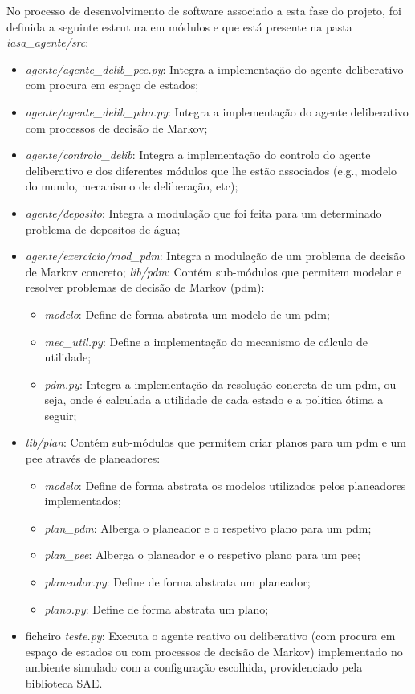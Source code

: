 No processo de desenvolvimento de software associado a esta fase do projeto, foi definida a seguinte estrutura em módulos e que está presente na pasta \textit{iasa\_agente/src}:

\begin{itemize}
    \item \textit{agente/agente\_delib\_pee.py}: Integra a implementação do agente deliberativo com procura em espaço de estados;
    \item \textit{agente/agente\_delib\_pdm.py}: Integra a implementação do agente deliberativo com processos de decisão de Markov;
    \item \textit{agente/controlo\_delib}: Integra a implementação do controlo do agente deliberativo e dos diferentes módulos que lhe estão associados (e.g., modelo do mundo, mecanismo de deliberação, etc);
    \item \textit{agente/deposito}: Integra a modulação que foi feita para um determinado problema de depositos de água;
    \item \textit{agente/exercicio/mod\_pdm}: Integra a modulação de um problema de decisão de Markov concreto;
    \textit{lib/pdm}: Contém sub-módulos que permitem modelar e resolver problemas de decisão de Markov (pdm):
    \begin{itemize}
        \item \textit{modelo}: Define de forma abstrata um modelo de um pdm;
        \item \textit{mec\_util.py}: Define a implementação do mecanismo de cálculo de utilidade;
        \item \textit{pdm.py}: Integra a implementação da resolução concreta de um pdm, ou seja, onde é calculada a utilidade de cada estado e a política ótima a seguir;
    \end{itemize}
    \item \textit{lib/plan}: Contém sub-módulos que permitem criar planos para um pdm e um pee através de planeadores:
    \begin{itemize}
        \item \textit{modelo}: Define de forma abstrata os modelos utilizados pelos planeadores implementados;
        \item \textit{plan\_pdm}: Alberga o planeador e o respetivo plano para um pdm;
        \item \textit{plan\_pee}: Alberga o planeador e o respetivo plano para um pee;
        \item \textit{planeador.py}: Define de forma abstrata um planeador;
        \item \textit{plano.py}: Define de forma abstrata um plano;
    \end{itemize}
    \item ficheiro \textit{teste.py}: Executa o agente reativo ou deliberativo (com procura em espaço de estados ou com processos de decisão de Markov) implementado no ambiente simulado com a configuração escolhida, providenciado pela biblioteca SAE.
\end{itemize}

